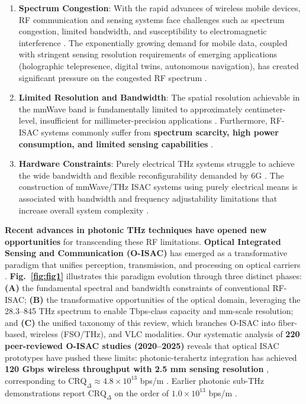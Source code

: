\documentclass[lettersize,journal]{IEEEtran}
\begin{document}
\begin{enumerate}
    \item \textbf{Spectrum Congestion}: With the rapid advances of wireless mobile devices, RF communication and sensing systems face challenges such as spectrum congestion, limited bandwidth, and susceptibility to electromagnetic interference \cite{O_ISAC_068}. The exponentially growing demand for mobile data, coupled with stringent sensing resolution requirements of emerging applications (holographic telepresence, digital twins, autonomous navigation), has created significant pressure on the congested RF spectrum \cite{O_ISAC_161}.
    \item \textbf{Limited Resolution and Bandwidth}: The spatial resolution achievable in the mmWave band is fundamentally limited to approximately centimeter-level, insufficient for millimeter-precision applications \cite{O_ISAC_021}. Furthermore, RF-ISAC systems commonly suffer from \textbf{spectrum scarcity, high power consumption, and limited sensing capabilities} \cite{O_ISAC_203}.
    \item \textbf{Hardware Constraints}: Purely electrical THz systems struggle to achieve the wide bandwidth and flexible reconfigurability demanded by 6G \cite{O_ISAC_070}. The construction of mmWave/THz ISAC systems using purely electrical means is associated with bandwidth and frequency adjustability limitations that increase overall system complexity \cite{O_ISAC_286}.
\end{enumerate}

\textbf{Recent advances in photonic THz techniques have opened new opportunities} for transcending these RF limitations. \textbf{Optical Integrated Sensing and Communication (O-ISAC)} has emerged as a transformative paradigm that unifies perception, transmission, and processing on optical carriers \cite{O_ISAC_021}. \textbf{Fig.~\ref{fig:fig1}} illustrates this paradigm evolution through three distinct phases: \textbf{(A)} the fundamental spectral and bandwidth constraints of conventional RF-ISAC; \textbf{(B)} the transformative opportunities of the optical domain, leveraging the 28.3--845 THz spectrum to enable Tbps-class capacity and mm-scale resolution; and \textbf{(C)} the unified taxonomy of this review, which branches O-ISAC into fiber-based, wireless (FSO/THz), and VLC modalities. Our systematic analysis of \textbf{220 peer-reviewed O-ISAC studies (2020--2025)} reveals that optical ISAC prototypes have pushed these limits: photonic-terahertz integration has achieved \textbf{120 Gbps wireless throughput with 2.5 mm sensing resolution} \cite{O_ISAC_105}, corresponding to $\text{CRQ}_{\Delta} \approx 4.8\times10^{13}$ bps/m \cite{O_ISAC_105}. Earlier photonic sub-THz demonstrations report $\text{CRQ}_{\Delta}$ on the order of $1.0\times10^{13}$ bps/m \cite{O_ISAC_016}.
\end{document}
